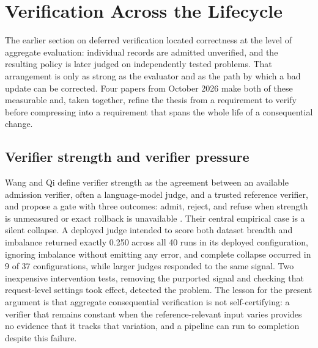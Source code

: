 \documentclass[11pt]{article}
\begin{document}
\section{Verification Across the Lifecycle}
\label{sec:lifecycle}

The earlier section on deferred verification located correctness at the
level of aggregate evaluation: individual records are admitted unverified,
and the resulting policy is later judged on independently tested problems.
That arrangement is only as strong as the evaluator and as the path by
which a bad update can be corrected. Four papers from October 2026 make
both of these measurable and, taken together, refine the thesis from a
requirement to verify before compressing into a requirement that spans the
whole life of a consequential change.

\subsection{Verifier strength and verifier pressure}

Wang and Qi define verifier strength as the agreement between an
available admission verifier, often a language-model judge, and a trusted
reference verifier, and propose a gate with three outcomes: admit, reject,
and refuse when strength is unmeasured or exact rollback is unavailable
\cite{wang2026recoverability}. Their central empirical case is a silent
collapse. A deployed judge intended to score both dataset breadth and
imbalance returned exactly 0.250 across all 40 runs in its deployed
configuration, ignoring imbalance without emitting any error, and complete
collapse occurred in 9 of 37 configurations, while larger judges
responded to the same signal. Two inexpensive intervention tests, removing
the purported signal and checking that request-level settings took
effect, detected the problem. The lesson for the present argument is that
aggregate consequential verification is not self-certifying: a verifier that remains constant when the reference-relevant input varies provides no evidence that it tracks that variation, and a pipeline can run to completion despite this failure.
\end{document}
